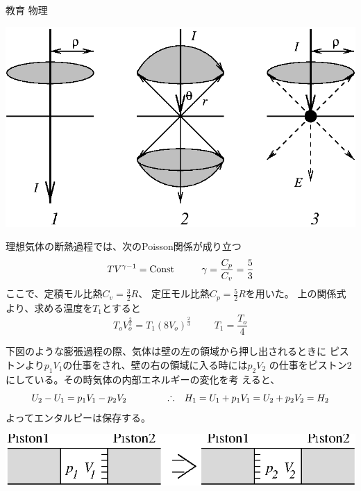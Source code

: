 \documentclass[fleqn]{jbook}
\begin{document}
\begin{answer}{教育 物理}{}
\begin{subanswers}
\begin{subsubanswers}
  \end{subsubanswers}

%
  \begin{center}
    \mbox{\includegraphics[clip]{1994phys-2.eps}}
  \end{center}

\newpage
\SubAnswer
  \begin{subsubanswers}
  \SubSubAnswer
    理想気体の断熱過程では、次のPoisson関係が成り立つ
%
    \[ TV^{\gamma-1} = {\rm Const} \hspace{1cm}%
       \gamma = \frac{C_p}{C_v}=\frac{5}{3} \]
%
    ここで、定積モル比熱$C_v=\frac{3}{2}R$、
    定圧モル比熱$C_p=\frac{5}{2}R$を用いた。
    上の関係式より、求める温度を$T_1$とすると
%
    \[ T_oV_o^{\frac{2}{3}} = T_1(8V_o)^{\frac{2}{3}} \hspace{1cm}%
       T_1 = \frac{T_o}{4} \]

  \SubSubAnswer
    下図のような膨張過程の際、気体は壁の左の領域から押し出されるときに
    ピストンより$p_1V_1$の仕事をされ、壁の右の領域に入る時には$p_2V_2$
    の仕事をピストン2にしている。その時気体の内部エネルギーの変化を考
    えると、
%
    \[ U_2 - U_1 = p_1V_1 - p_2V_2 \hspace{15mm}%
       \Yueni H_1 = U_1+p_1V_1 = U_2+p_2V_2 = H_2 \]
%
    よってエンタルピーは保存する。
%
    \begin{center}
      \mbox{\includegraphics[clip]{1994phys-3.eps}}
    \end{center}



\end{subsubanswers}
\end{subanswers}
\end{answer}
\end{document}
